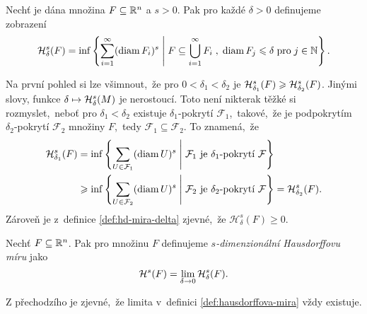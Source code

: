 \begin{definition}\label{def:hd-mira-delta}
    Nechť je dána množina $F\subseteq\R^n$ a $s>0$. Pak pro každé $\delta>0$ definujeme zobrazení
    \[\hausdorffdeltameasure{s}{\delta}(F)=\inf\set{\sum_{i=1}^{\infty}(\diam{F_i})^s\;\middle|\;F\subseteq\bigcup_{i=1}^\infty F_i\;,\;\diam{F_j}\leqslant\delta\;\text{pro}\;j\in\N}.\]
\end{definition}
Na první pohled si lze všimnout,~že pro $0<\delta_1<\delta_2$ je $\hausdorffdeltameasure{s}{\delta_1}(F)\geqslant\hausdorffdeltameasure{s}{\delta_2}(F)$. Jinými slovy, funkce $\delta\mapsto\hausdorffdeltameasure{s}{\delta}(M)$ je nerostoucí. Toto není nikterak těžké si rozmyslet,~neboť pro $\delta_1<\delta_2$ existuje $\delta_1$-pokrytí $\mathcal{F}_1$,~takové,~že je podpokrytím $\delta_2$-pokrytí $\mathcal{F}_2$ množiny $F$,~tedy $\mathcal{F}_1\subseteq\mathcal{F}_2$. To znamená,~že
\begin{align*}
    \hausdorffdeltameasure{s}{\delta_1}(F)&=\inf\set{\sum_{U\in\mathcal{F}_1}(\diam{U})^s\;\middle|\;\text{$\mathcal{F}_1$ je $\delta_1$-pokrytí $\mathcal{F}$}}\\
    &\geqslant\inf\set{\sum_{U\in\mathcal{F}_2}(\diam{U})^s\;\middle|\;\text{$\mathcal{F}_2$ je $\delta_2$-pokrytí $\mathcal{F}$}}=\hausdorffdeltameasure{s}{\delta_2}(F).
\end{align*}
Zároveň je z~definice \ref{def:hd-mira-delta} zjevné,~že $\mathcal{H}_\delta^s(F)\geqslant 0$.
\begin{definition}\label{def:hausdorffova-mira}
    Nechť $F\subseteq\R^n$. Pak pro množinu $F$ definujeme \emph{$s$-dimenzionální Hausdorffovu míru} jako
    \[\hausdorffmeasure{s}(F)=\lim_{\delta\to 0}\hausdorffdeltameasure{s}{\delta}(F).\]
\end{definition}
Z přechodzího je zjevné,~že limita v~definici \ref{def:hausdorffova-mira} vždy existuje.

